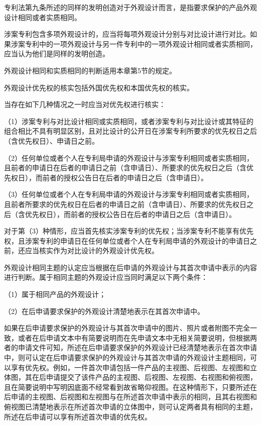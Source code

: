 专利法第九条所述的同样的发明创造对于外观设计而言，是指要求保护的产品外观设计相同或者实质相同。

涉案专利包含多项外观设计的，应当将每项外观设计分别与对比设计进行对比。如果涉案专利中的一项外观设计与另一件专利中的一项外观设计相同或者实质相同，应当认为他们是同样的发明创造。

外观设计相同和实质相同的判断适用本章第5节的规定。

外观设计优先权的核实包括外国优先权和本国优先权的核实。

当存在如下几种情况之一时应当对优先权进行核实：

{\setlength{\parindent}{17.1bp}（1）涉案专利与对比设计相同或实质相同，或者涉案专利与对比设计或其特征的组合相比不具有明显区别，且对比设计的公开日在涉案专利所要求的优先权日之后（含优先权日）、申请日之前。\par}

{\setlength{\parindent}{17.1bp}（2）任何单位或者个人在专利局申请的外观设计与涉案专利相同或者实质相同，且前者的申请日在后者的申请日之前（含申请日）、所要求的优先权日之后（含优先权日），而前者的授权公告日在后者的申请日之后（含申请日）。\par}

{\setlength{\parindent}{17.1bp}（3）任何单位或者个人在专利局申请的外观设计与涉案专利相同或者实质相同，且前者所要求的优先权日在后者的申请日之前（含申请日）、所要求的优先权日之后（含优先权日），而前者的授权公告日在后者的申请日之后（含申请日）。\par}

对于第（3）种情形，应当首先核实涉案专利的优先权；当涉案专利不能享有优先权，且涉案专利的申请日在任何单位或者个人在专利局申请的外观设计的申请日之前，还应当核实作为对比设计的外观设计优先权。

外观设计相同主题的认定应当根据在后申请的外观设计与其首次申请中表示的内容进行判断。属于相同主题的外观设计应当同时满足以下两个条件：

{\setlength{\parindent}{17.1bp}（1）属于相同产品的外观设计；\par}

{\setlength{\parindent}{17.1bp}（2）在后申请要求保护的外观设计清楚地表示在其首次申请中。\par}

如果在后申请要求保护的外观设计与其首次申请中的图片、照片或者附图不完全一致，或者在后申请文本中有简要说明而在先申请文本中无相关简要说明，但根据两者的申请文件可知，所述在后申请要求保护的外观设计已经清楚地表示在首次申请中，则可认定在后申请要求保护的外观设计与其首次申请的外观设计主题相同，可以享有优先权。例如，一件首次申请包括一件产品的主视图、后视图、左视图和立体图，其在后申请提交了该件产品的主视图、后视图、左视图、右视图和俯视图，且在简要说明中写明因底面不经常看到故省略仰视图。在这种情形下，只要所述在后申请的主视图、后视图和左视图与在所述首次申请中表示的相同，且其右视图和俯视图已清楚地表示在所述首次申请的立体图中，则可认定两者具有相同的主题，所述在后申请可以享有所述首次申请的优先权。


